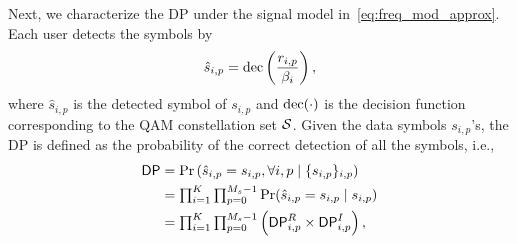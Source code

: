 \documentclass[10pt,twocolumn,twoside]{IEEEtran}
\begin{document}


Next, we characterize the DP under the signal model in~\eqref{eq:freq_mod_approx}.
Each user detects the symbols by
\begin{equation}\label{eq:dec}
	\hat{s}_{i,p} = {\rm dec} \left( \frac{r_{i,p}}{\beta_i} \right),
\end{equation}
where $\hat{s}_{i,p}$ is the detected symbol of $s_{i,p}$ and ${\rm dec}(\cdot)$ is the decision function corresponding to the QAM constellation set $\mathcal{S}$.
Given the data symbols $s_{i,p}$'s, the DP is defined as the probability of the correct detection of all the symbols, i.e.,
\begin{equation}\label{eq:dp}
	\begin{aligned}
		{\sf DP} &= \textstyle  {\rm Pr}\left( \hat{s}_{i,p} = s_{i,p}, \forall i,p \mid  \{s_{i,p}\}_{i,p} \right) \\
		&= \textstyle \prod_{i=1}^K \prod_{p=0}^{M_s-1} {\rm Pr}( \hat{s}_{i,p} = s_{i,p} \mid  s_{i,p} ) \\
		&= \textstyle \prod_{i=1}^K \prod_{p=0}^{M_s-1} \left( {\sf DP}^R_{i,p} \times {\sf DP}^I_{i,p} \right),
	\end{aligned}
\end{equation}
\end{document}
